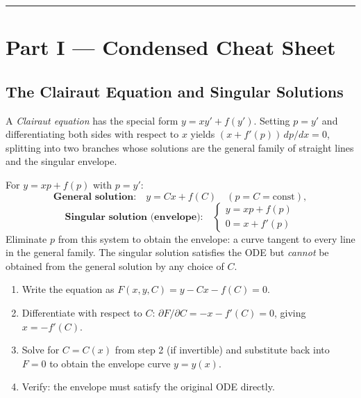 \vspace{0.6em}
\hrule
\vspace{0.6em}

{}
\section*{Part I --- Condensed Cheat Sheet}
\setcounter{section}{8}   %

\subsection{The Clairaut Equation and Singular Solutions}

A \emph{Clairaut equation} has the special form $y = xy' + f(y')$.
Setting $p = y'$ and differentiating both sides with respect to $x$ yields
$(x + f'(p))\,dp/dx = 0$, splitting into two branches whose solutions are
the general family of straight lines and the singular envelope.

\begin{formulabox}
For $y = xp + f(p)$ with $p = y'$:
\[
  \textbf{General solution:}\quad y = Cx + f(C) \quad (p = C = \text{const}),
\]
\[
  \textbf{Singular solution (envelope):}\quad
  \begin{cases}
    y = xp + f(p) \\
    0 = x + f'(p)
  \end{cases}
\]
Eliminate $p$ from this system to obtain the envelope: a curve tangent to every
line in the general family.
The singular solution satisfies the ODE but \emph{cannot} be obtained from the
general solution by any choice of $C$.
\end{formulabox}

\begin{methodbox}
\begin{enumerate}[leftmargin=1.6em, itemsep=3pt]
  \item Write the equation as $F(x,y,C) = y - Cx - f(C) = 0$.
  \item Differentiate with respect to $C$: $\partial F/\partial C = -x - f'(C) = 0$,
        giving $x = -f'(C)$.
  \item Solve for $C = C(x)$ from step 2 (if invertible) and substitute back
        into $F = 0$ to obtain the envelope curve $y = y(x)$.
  \item Verify: the envelope must satisfy the original ODE directly.
\end{enumerate}
\end{methodbox}

